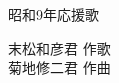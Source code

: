 \documentclass[10pt,b5j]{tarticle} %
\begin{document}
\begin{minipage}[c]{0.7\hsize} %
    \begin{center}
        {\LARGE
            昭和9年応援歌 %
        }
        {\small 
        }
    \end{center}
\end{minipage}
\begin{minipage}[c]{0.3\hsize} %
    \begin{flushright} %
        末松和彦君 作歌\\菊地修二君 作曲 %
    \end{flushright}
\end{minipage}
\end{document}
